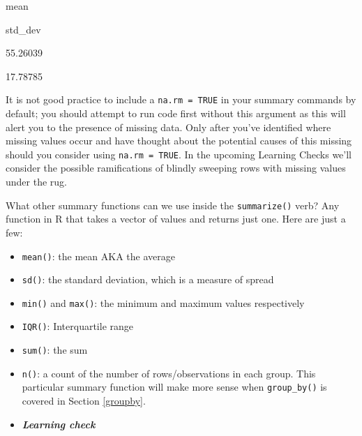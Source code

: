 \documentclass[12pt,]{krantz}
\makeatletter
\newenvironment{Shaded}{\begin{snugshade}}{\end{snugshade}}
\newcommand{\KeywordTok}[1]{\textcolor[rgb]{0.27,0.27,0.27}{\textbf{#1}}}
\newcommand{\DataTypeTok}[1]{\textcolor[rgb]{0.27,0.27,0.27}{#1}}
\newcommand{\StringTok}[1]{\textcolor[rgb]{0.5,0.5,0.5}{#1}}
\newcommand{\OtherTok}[1]{\textcolor[rgb]{0.37,0.37,0.37}{#1}}
\newcommand{\OperatorTok}[1]{\textcolor[rgb]{0.43,0.43,0.43}{\textbf{#1}}}
\newcommand{\NormalTok}[1]{#1}
\providecommand{\tightlist}{%
  \setlength{\itemsep}{0pt}\setlength{\parskip}{0pt}}
\newenvironment{kframe}{%
\medskip{}
\setlength{\fboxsep}{.8em}
 \def\at@end@of@kframe{}%
 \ifinner\ifhmode%
  \def\at@end@of@kframe{\end{minipage}}%
  \begin{minipage}{\columnwidth}%
 \fi\fi%
 \def\FrameCommand##1{\hskip\@totalleftmargin \hskip-\fboxsep
 \colorbox{shadecolor}{##1}\hskip-\fboxsep
     \hskip-\linewidth \hskip-\@totalleftmargin \hskip\columnwidth}%
 \MakeFramed {\advance\hsize-\width
   \@totalleftmargin\z@ \linewidth\hsize
   \@setminipage}}%
 {\par\unskip\endMakeFramed%
 \at@end@of@kframe}
\renewenvironment{Shaded}{\begin{kframe}}{\end{kframe}}
\newenvironment{rmdblock}[1]
  {\begin{shaded*}
  \begin{itemize}
  \renewcommand{\labelitemi}{
    \raisebox{-.7\height}[0pt][0pt]{
    }
  }
  \item
  }
  {
  \end{itemize}
  \end{shaded*}
  }
\newenvironment{learncheck}
  {\begin{rmdblock}{warning}}
  {\end{rmdblock}}
\makeatother
\begin{document}
\begin{Shaded}
\end{Shaded}

mean

std\_dev

55.26039

17.78785

It is not good practice to include a \texttt{na.rm\ =\ TRUE} in your
summary commands by default; you should attempt to run code first
without this argument as this will alert you to the presence of missing
data. Only after you've identified where missing values occur and have
thought about the potential causes of this missing should you consider
using \texttt{na.rm\ =\ TRUE}. In the upcoming Learning Checks we'll
consider the possible ramifications of blindly sweeping rows with
missing values under the rug.

What other summary functions can we use inside the \texttt{summarize()}
verb? Any function in R that takes a vector of values and returns just
one. Here are just a few:

\begin{itemize}
\tightlist
\item
  \texttt{mean()}: the mean AKA the average
\item
  \texttt{sd()}: the standard deviation, which is a measure of spread
\item
  \texttt{min()} and \texttt{max()}: the minimum and maximum values
  respectively
\item
  \texttt{IQR()}: Interquartile range
\item
  \texttt{sum()}: the sum
\item
  \texttt{n()}: a count of the number of rows/observations in each
  group. This particular summary function will make more sense when
  \texttt{group\_by()} is covered in Section \ref{groupby}.
\end{itemize}

\begin{learncheck}
\textbf{\emph{Learning check}}
\end{learncheck}
\end{document}
